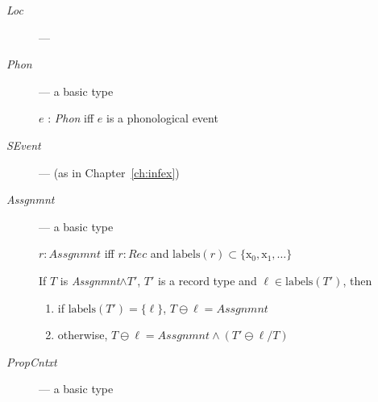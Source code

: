 \begin{description}

  \item[\textnormal{\textit{Loc}}] --- 

  
\item[\textnormal{\textit{Phon}}] --- a basic type

  $e$ : \textit{Phon} iff $e$ is a phonological event
  
\item[\textnormal{\textit{SEvent}}] ---  (as in
      Chapter~\ref{ch:infex})

      \item[\textnormal{\textit{Assgnmnt}}] --- a basic type

      $r:\textit{Assgnmnt}$ iff
$r:\textit{Rec}$ and
$\mathrm{labels}(r)\subset\{\text{x}_0,\text{x}_1,\ldots\}$

\bigskip

If $T$ is \textit{Assgnmnt}$\wedge T'$, $T'$ is a record type and
  $\ell\in\mathrm{labels}(T')$, then
  \begin{enumerate} 
    
  \item if $\mathrm{labels}(T')=\{\ell\}$, $T\ominus\ell=\textit{Assgnmnt}$ 
    
  \item otherwise, $T\ominus\ell= \textit{Assgnmnt}\wedge (T'\ominus\ell/T)$
    
  \end{enumerate}

    
    

  

\item[\textnormal{\textit{PropCntxt}}] --- a basic type


\end{description}

